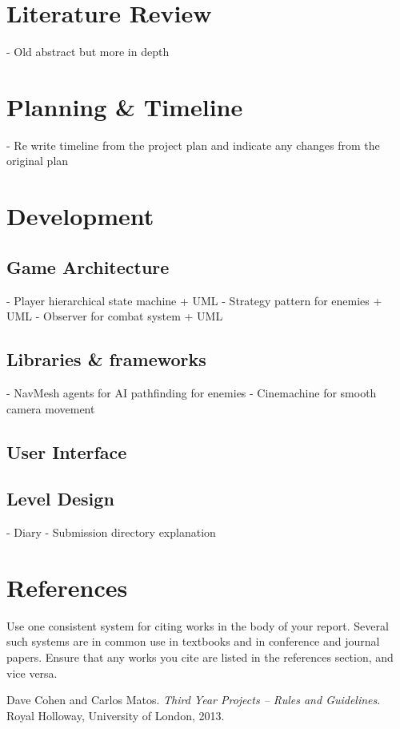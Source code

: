 \documentclass[]{final_report}
\begin{document}
\chapter{Literature Review}
- Old abstract but more in depth

\chapter{Planning \& Timeline}
- Re write timeline from the project plan and indicate any changes from the original plan

\chapter{Development}
\section{Game Architecture}
- Player hierarchical state machine + UML \newline
- Strategy pattern for enemies + UML \newline
- Observer for combat system + UML \newline
\section{Libraries \& frameworks}
- NavMesh agents for AI pathfinding for enemies \newline
- Cinemachine for smooth camera movement \newline
\section{User Interface}
\section{Level Design}

- Diary \newline
- Submission directory explanation \newline

\chapter{References}

Use one consistent system for citing works in the body of your report. Several such systems are in common use in textbooks and in conference and journal papers. Ensure that any works you cite are listed in the references section, and vice versa. 


\newpage
\begin{thebibliography}{99}
 Dave Cohen and Carlos Matos. \emph{Third Year Projects -- Rules and Guidelines}. Royal Holloway, University of London, 2013.
\end{thebibliography}
\label{endpage}
\end{document}
